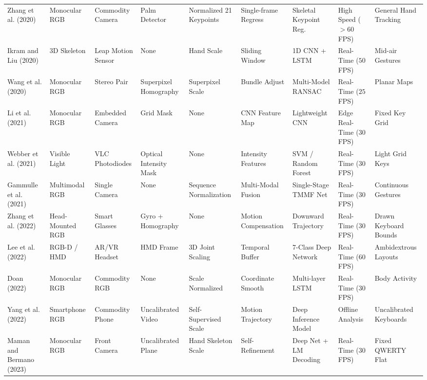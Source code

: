\begin{table}[htbp]
\begin{tabular}{l l l l l l l l l}
Zhang et al. (2020) \cite{Zhang2020MediaPipe} & Monocular RGB & Commodity Camera & Palm Detector & Normalized 21 Keypoints & Single-frame Regress & Skeletal Keypoint Reg. & High Speed ($> 60$ FPS) & General Hand Tracking \\
Ikram and Liu (2020) \cite{Ikram2020Skeleton} & 3D Skeleton & Leap Motion Sensor & None & Hand Scale & Sliding Window & 1D CNN + LSTM & Real-Time ($50$ FPS) & Mid-air Gestures \\
Wang et al. (2020) \cite{Wang2020Relative} & Monocular RGB & Stereo Pair & Superpixel Homography & Superpixel Scale & Bundle Adjust & Multi-Model RANSAC & Real-Time ($25$ FPS) & Planar Maps \\
Li et al. (2021) \cite{Li2021CNN} & Monocular RGB & Embedded Camera & Grid Mask & None & CNN Feature Map & Lightweight CNN & Edge Real-Time ($30$ FPS) & Fixed Key Grid \\
Webber et al. (2021) \cite{Webber2021Finger} & Visible Light & VLC Photodiodes & Optical Intensity Mask & None & Intensity Features & SVM / Random Forest & Real-Time ($30$ FPS) & Light Grid Keys \\
Gammulle et al. (2021) \cite{Gammulle2021TMMF} & Multimodal RGB & Single Camera & None & Sequence Normalization & Multi-Modal Fusion & Single-Stage TMMF Net & Real-Time ($30$ FPS) & Continuous Gestures \\
Zhang et al. (2022) \cite{Zhang2022DynaKey} & Head-Mounted RGB & Smart Glasses & Gyro + Homography & None & Motion Compensation & Downward Trajectory & Real-Time ($30$ FPS) & Drawn Keyboard Bounds \\
Lee et al. (2022) \cite{Lee2022Virtual} & RGB-D / HMD & AR/VR Headset & HMD Frame & 3D Joint Scaling & Temporal Buffer & 7-Class Deep Network & Real-Time ($60$ FPS) & Ambidextrous Layouts \\
Doan (2022) \cite{Doan2022Efficient} & Monocular RGB & Commodity RGB & None & Scale Normalized & Coordinate Smooth & Multi-layer LSTM & Real-Time ($30$ FPS) & Body Activity \\
Yang et al. (2022) \cite{Yang2022Towards} & Smartphone RGB & Commodity Phone & Uncalibrated Video & Self-Supervised Scale & Motion Trajectory & Deep Inference Model & Offline Analysis & Uncalibrated Keyboards \\
Maman and Bermano (2023) \cite{Maman2023TypeNet} & Monocular RGB & Front Camera & Uncalibrated Plane & Hand Skeleton Scale & Self-Refinement & Deep Net + LM Decoding & Real-Time ($30$ FPS) & Fixed QWERTY Flat \\

\end{tabular}
\end{table}
